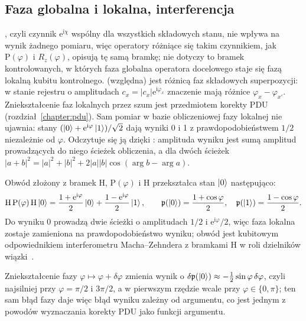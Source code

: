 \subsection{Faza globalna i lokalna, interferencja}\label{subsec:tb:phase}

, czyli czynnik $\mathrm{e}^{\mathrm{i}\chi}$ wspólny dla wszystkich składowych stanu, nie wpływa na wynik żadnego pomiaru, więc operatory różniące się takim czynnikiem, jak $\mathrm{P}(\varphi)$ i $R_z(\varphi)$, opisują tę samą bramkę; nie dotyczy to bramek kontrolowanych, w których faza globalna operatora docelowego staje się fazą lokalną kubitu kontrolnego.
 (względna) jest różnicą faz składowych superpozycji: w stanie rejestru o amplitudach $c_x=|c_x|\mathrm{e}^{\mathrm{i}\varphi_x}$ znaczenie mają różnice $\varphi_x-\varphi_{x'}$.
Zniekształcenie faz lokalnych przez szum jest przedmiotem korekty PDU (rozdział~\ref{chapter:pdu}).
Sam pomiar w bazie obliczeniowej fazy lokalnej nie ujawnia: stany $(\ket{0}+\mathrm{e}^{\mathrm{i}\varphi}\ket{1})/\sqrt{2}$ dają wyniki 0 i 1 z prawdopodobieństwem $1/2$ niezależnie od $\varphi$.
Odczytuje się ją dzięki : amplituda wyniku jest sumą amplitud prowadzących do niego ścieżek obliczenia, a dla dwóch ścieżek $|a+b|^2=|a|^2+|b|^2+2|a||b|\cos(\arg b-\arg a)$.

\begin{Example}\label{ex:tb01:interference}
Obwód złożony z bramek $\mathrm{H}$, $\mathrm{P}(\varphi)$ i $\mathrm{H}$ przekształca stan $\ket{0}$ następująco:
\begin{equation}\label{eq:tb01:interference}
  \mathrm{H}\,\mathrm{P}(\varphi)\,\mathrm{H}\ket{0}=\frac{1+\mathrm{e}^{\mathrm{i}\varphi}}{2}\ket{0}+\frac{1-\mathrm{e}^{\mathrm{i}\varphi}}{2}\ket{1},
  \qquad
  \mathfrak{p}(\ket{0})=\frac{1+\cos\varphi}{2},\quad
  \mathfrak{p}(\ket{1})=\frac{1-\cos\varphi}{2}.
\end{equation}
Do wyniku 0 prowadzą dwie ścieżki o amplitudach $1/2$ i $\mathrm{e}^{\mathrm{i}\varphi}/2$, więc faza lokalna zostaje zamieniona na prawdopodobieństwo wyniku; obwód jest kubitowym odpowiednikiem interferometru Macha--Zehndera z bramkami $\mathrm{H}$ w roli dzielników wiązki~\cite{wereszczynski_cosine_2020}.
\end{Example}

Zniekształcenie fazy $\varphi\mapsto\varphi+\delta\varphi$ zmienia wynik o $\delta\mathfrak{p}(\ket{0})\approx-\frac{1}{2}\sin\varphi\,\delta\varphi$, czyli najsilniej przy $\varphi=\pi/2$ i $3\pi/2$, a w pierwszym rzędzie wcale przy $\varphi\in\{0,\pi\}$; ten sam błąd fazy daje więc błąd wyniku zależny od argumentu, co jest jednym z powodów wyznaczania korekty PDU jako funkcji argumentu.

